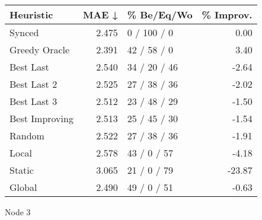 \begin{tabular}{lrlr}
\toprule
\textbf{Heuristic} & \textbf{MAE ↓} & \textbf{\% Be/Eq/Wo} & \textbf{\% Improv.} \\
\midrule
            Synced &          2.475 &          0 / 100 / 0 &                0.00 \\
     Greedy Oracle &          2.391 &          42 / 58 / 0 &                3.40 \\
         Best Last &          2.540 &         34 / 20 / 46 &               -2.64 \\
       Best Last 2 &          2.525 &         27 / 38 / 36 &               -2.02 \\
       Best Last 3 &          2.512 &         23 / 48 / 29 &               -1.50 \\
    Best Improving &          2.513 &         25 / 45 / 30 &               -1.54 \\
            Random &          2.522 &         27 / 38 / 36 &               -1.91 \\
             Local &          2.578 &          43 / 0 / 57 &               -4.18 \\
            Static &          3.065 &          21 / 0 / 79 &              -23.87 \\
            Global &          2.490 &          49 / 0 / 51 &               -0.63 \\
\bottomrule
\end{tabular}
\caption{Node 3}
\label{tab:hr_iid_lr05_le1_bs2_3}
